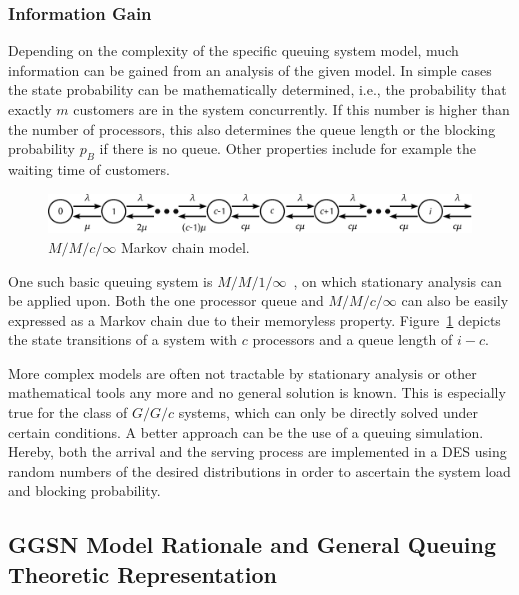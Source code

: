 \subsubsection{Information Gain}

Depending on the complexity of the specific queuing system model, much information can be gained from an analysis of the given model. In simple cases the state probability can be mathematically determined, i.e., the probability that exactly $m$ customers are in the system concurrently. If this number is higher than the number of processors, this also determines the queue length or the blocking probability $p_B$ if there is no queue. Other properties include for example the waiting time of customers.

\begin{figure}[htb]
	\centering
	\includegraphics[width=1.0\textwidth]{images/markovchain.pdf}
	\caption{$M/M/c/\infty$ Markov chain model.}
\label{c4:fig:markovchain}
\end{figure}

One such basic queuing system is $M/M/1/\infty$~\cite[pp.~94-99]{Kleinrock:1975:TVQ:1096491}, on which stationary analysis can be applied upon. Both the one processor queue and $M/M/c/\infty$ can also be easily expressed as a Markov chain due to their memoryless property. Figure~\ref{c4:fig:markovchain} depicts the state transitions of a system with $c$ processors and a queue length of $i-c$.

More complex models are often not tractable by stationary analysis or other mathematical tools any more and no general solution is known. This is especially true for the class of $G/G/c$ systems, which can only be directly solved under certain conditions. A better approach can be the use of a queuing simulation. Hereby, both the arrival and the serving process are implemented in a \gls{DES} using random numbers of the desired distributions in order to ascertain the system load and blocking probability.


\subsection{GGSN Model Rationale and General Queuing Theoretic Representation}

